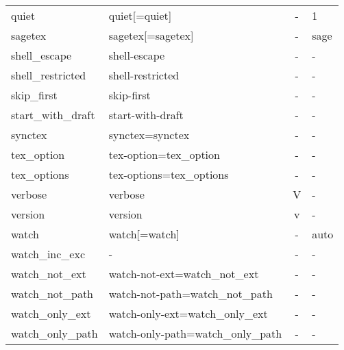 \begin{longtable}{llcX}
quiet & quiet[=quiet] & - & 1 \\
sagetex & sagetex[=sagetex] & - & sage \\
shell\_escape & shell-escape & - & - \\
shell\_restricted & shell-restricted & - & - \\
skip\_first & skip-first & - & - \\
start\_with\_draft & start-with-draft & - & - \\
synctex & synctex=synctex & - & - \\
tex\_option & tex-option=tex\_option & - & - \\
tex\_options & tex-options=tex\_options & - & - \\
verbose & verbose & V & - \\
version & version & v & - \\
watch & watch[=watch] & - & auto \\
watch\_inc\_exc & - & - & - \\
watch\_not\_ext & watch-not-ext=watch\_not\_ext & - & - \\
watch\_not\_path & watch-not-path=watch\_not\_path & - & - \\
watch\_only\_ext & watch-only-ext=watch\_only\_ext & - & - \\
watch\_only\_path & watch-only-path=watch\_only\_path & - & - \\
\bottomrule
\end{longtable}